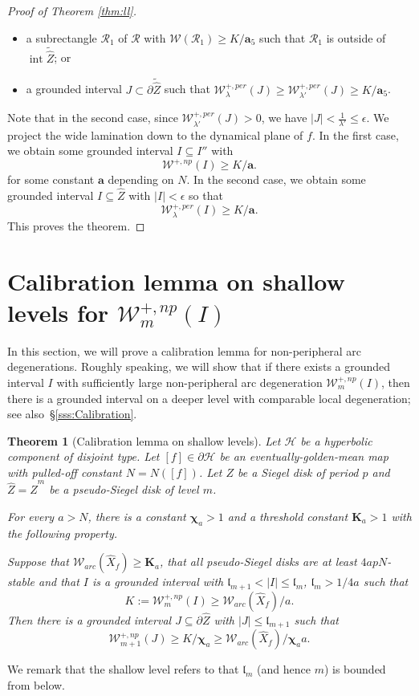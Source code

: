 \documentclass[11pt, reqno]{amsart}
\numberwithin{equation}{section}
\theoremstyle{plain}
\newtheorem{theorem}{Theorem}[section]
\theoremstyle{theorem}
\theoremstyle{plain}
\theoremstyle{definition}
\numberwithin{figure}{section}
\newcommand{\Width}{{\mathcal W}}
\newcommand\RR{\mathcal{R}}
\newcommand\intr{\operatorname{int}}
\newcommand{\wZ}{{\widehat Z}}
\begin{document}
\begin{proof}[Proof of Theorem \ref{thm:ll}]
{\begin{itemize}
    \item a subrectangle  $\RR_1$ of $\RR$ with $\Width(\RR_1) \ge K/\mathbf{a}_5 $ such that $\RR_1$ is outside of $\intr \widetilde \wZ$; or   
    \item a grounded interval $J\subset \partial \widetilde \wZ$ such that $\Width^{+, per}_{\lambda}(J) \geq \Width^{+, per}_{\lambda'}(J) \ge K/\mathbf{a}_5$.
\end{itemize}
Note that in the second case, since $\Width^{+, per}_{\lambda'}(J)> 0$, we have $|J| < \frac{1}{\lambda'} \leq \epsilon$.
We project the wide lamination down to the dynamical plane of $f$.
In the first case, we obtain some grounded interval $I \subseteq I''$ with 
$$
\mathcal{W}^{+,np}(I) \geq K/\mathbf{a}.
$$
for some constant $\mathbf{a}$ depending on $N$. 
In the second case, we obtain some grounded interval $I \subseteq \wZ$ with $|I| < \epsilon$ so that 
$$
\mathcal{W}_{\lambda}^{+,per}(I) \geq K/\mathbf{a}.
$$
This proves the theorem.
}
\end{proof}


\section{Calibration lemma on shallow levels for $\Width^{+, np}_m(I)$}\label{sec:cld}
In this section, we will prove a calibration lemma for non-peripheral arc degenerations. 
Roughly speaking, we will show that if there exists a grounded interval $I$ with sufficiently large non-peripheral arc degeneration $\mathcal{W}_{m}^{+, np}(I)$, then there is a grounded interval on a deeper level with comparable local degeneration; see also~\S \ref{sss:Calibration}.


\begin{theorem}[Calibration lemma on shallow levels]\label{thm:calls}
Let $\mathcal{H}$ be a hyperbolic component of disjoint type.
Let $[f] \in \partial \mathcal{H}$ be an eventually-golden-mean map  with pulled-off constant $N = N([f])$.
Let $Z$ be a Siegel disk of period $p$ and $\widehat Z = \widehat Z^m$ be a pseudo-Siegel disk of level $m$.

For every $a > N$, there is a constant $\boldsymbol{\chi}_{a} > 1$ 
and a threshold constant $\mathbf{K}_{a} > 1$ with the following property. 

Suppose that $\mathcal{W}_{arc}(\widehat X_f) \geq \mathbf{K}_{a}$, {that all pseudo-Siegel disks are at least $4apN$-stable} and that
$I$ is a grounded interval with $\mathfrak{l}_{m+1} < \vert I \vert \leq \mathfrak{l}_m$, $\mathfrak{l}_m > 1/4a$ such that 
$$
K:= \mathcal{W}_{m}^{+, np}(I) \geq \mathcal{W}_{arc}(\widehat X_f)/a.
$$
Then there is a grounded interval $J \subseteq \partial \widehat Z$ with $\vert J \vert \leq \mathfrak{l}_{m+1}$ such that $$\mathcal{W}_{m+1}^{+, np}(J) \geq K/\boldsymbol{\chi}_{a} \geq \mathcal{W}_{arc}(\widehat X_f)/\boldsymbol{\chi}_{a}a.
$$
\end{theorem}
We remark that the shallow level refers to that $\mathfrak{l}_m$ (and hence $m$) is bounded from below.
\end{document}
